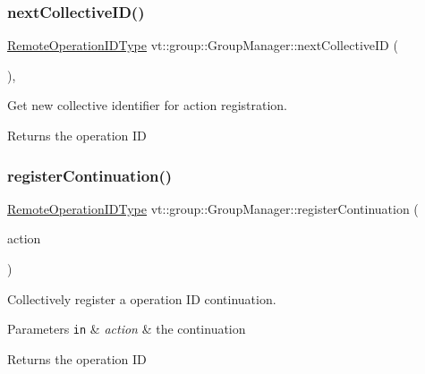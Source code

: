 \subsubsection{\texorpdfstring{next\+Collective\+I\+D()}{nextCollectiveID()}}
{\footnotesize\ttfamily \hyperlink{namespacevt_1_1group_a73f2624ddeb535b39a08b6524f26b244}{Remote\+Operation\+I\+D\+Type} vt\+::group\+::\+Group\+Manager\+::next\+Collective\+ID (\begin{DoxyParamCaption}{ }\end{DoxyParamCaption})\hspace{0.3cm}{\ttfamily [inline]}, {\ttfamily [private]}}



Get new collective identifier for action registration. 

\begin{DoxyReturn}{Returns}
the operation ID 
\end{DoxyReturn}
\mbox{\label{structvt_1_1group_1_1_group_manager_aebb439bebdefc27cfa6408e5cf0f7741}} 
\subsubsection{\texorpdfstring{register\+Continuation()}{registerContinuation()}\hspace{0.1cm}{\footnotesize\ttfamily [1/2]}}
{\footnotesize\ttfamily \hyperlink{namespacevt_1_1group_a73f2624ddeb535b39a08b6524f26b244}{Remote\+Operation\+I\+D\+Type} vt\+::group\+::\+Group\+Manager\+::register\+Continuation (\begin{DoxyParamCaption}\item[{\hyperlink{namespacevt_ae0a5a7b18cc99d7b732cb4d44f46b0f3}{Action\+Type}}]{action }\end{DoxyParamCaption})\hspace{0.3cm}{\ttfamily [private]}}



Collectively register a operation ID continuation. 


\begin{DoxyParams}[1]{Parameters}
\mbox{\tt in}  & {\em action} & the continuation\\
\hline
\end{DoxyParams}
\begin{DoxyReturn}{Returns}
the operation ID 
\end{DoxyReturn}
\mbox{\label{structvt_1_1group_1_1_group_manager_a0e67cdbacf259a8e4447bd3943dd6fdb}} 

